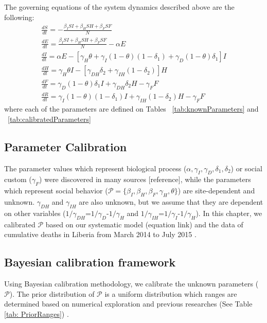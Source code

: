  
The governing equations of the system dynamics described above are the following:
\begin{eqnarray} 
\label{SDeqn}
\frac{dS}{dt} = - \frac{\beta_{I}SI+\beta_{H}SH+\beta_{F}SF}{N}\\
\frac{dE}{dt} =  \frac{\beta_{I}SI+\beta_{H}SH+\beta_{F}SF}{N}-\alpha E\\
\frac{dI}{dt} =  \alpha E - [\gamma_{H}\theta + \gamma_{I}(1-\theta)(1-\delta_{1})+\gamma_{D}(1-\theta)\delta_{1}]I\\
\frac{dH}{dt} = \gamma_{H}\theta I - [\gamma_{DH}\delta_{2}+\gamma_{IH}(1-\delta_{2})]H\\
\frac{dF}{dt} = \gamma_{D}(1-\theta) \delta_{1} I + \gamma_{DH}\delta_{2} H-\gamma_{F} F\\
\frac{dR}{dt} = \gamma_{I}(1-\theta)(1- \delta_{1}) I + \gamma_{IH}(1-\delta_{2}) H-\gamma_{F} F
\end{eqnarray}
where each of the parameters are defined on Tables ~\ref{tab:knownParameters} and ~\ref{tab:calibratedParameters}

\subsection{Parameter Calibration}

The parameter values which represent biological process ($\alpha, \gamma_{I}, \gamma_{D}, \delta_{1}, \delta_{2}$) or social custom ($\gamma_{F}$) were discovered in many sources [reference], while the parameters which represent social behavior ($\mathcal{P}=\{\beta_{I}, \beta_{H}, \beta_{F}, \gamma_{H}, \theta\}$) are site-dependent and unknown. $\gamma_{DH}$ and $\gamma_{IH}$ are also unknown, but we assume that they are dependent on other variables ($1/\gamma_{DH}$=$1/\gamma_{D}$-$1/\gamma_{H}$ and $1/\gamma_{IH}$=$1/\gamma_{I}$-$1/\gamma_{H}$). In this chapter, we calibrated $\mathcal{P}$ based on our systematic model (equation link) and the data of cumulative deaths in Liberia from March 2014 to July 2015 \cite{CDCData}.\\

\subsection{Bayesian calibration framework}
Using Bayesian calibration methodology, we calibrate the unknown parameters ($\mathcal{P}$). The prior distribution of $\mathcal{P}$ is a uniform distribution which ranges are determined based on numerical exploration and previous researches (See Table \ref{tab: PriorRanges}) \cite{Rivers2014}. \\

